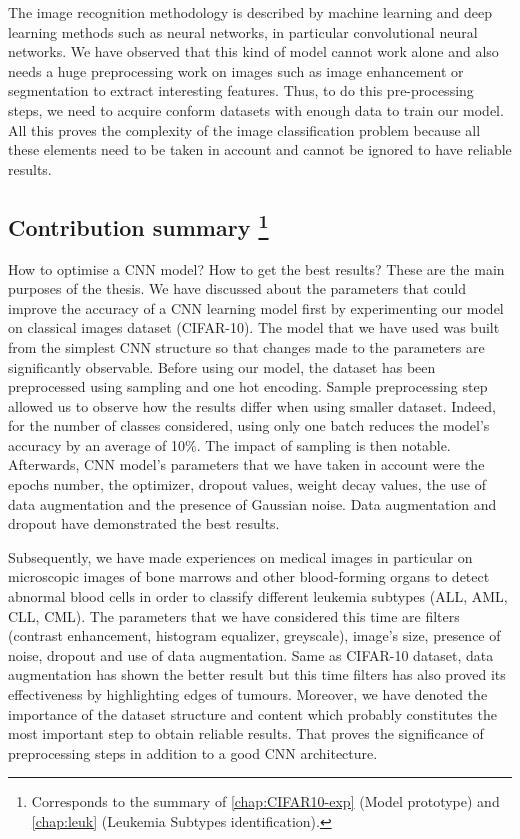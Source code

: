 \documentclass[11pt, openany]{report}
\theoremstyle{plain}
\theoremstyle{definition}
\theoremstyle{remark}
\begin{document}
The image recognition methodology is described by machine learning and deep learning methods such as neural networks, in particular convolutional neural networks. We have observed that this kind of model cannot work alone and also needs a huge preprocessing work on images such as image enhancement or segmentation to extract interesting features. Thus, to do this pre-processing steps, we need to acquire conform datasets with enough data to train our model. All this proves the complexity of the image classification problem because all these elements need to be taken in account and cannot be ignored to have reliable results.    

\subsection{Contribution summary \protect\footnote{Corresponds to the summary of \autoref{chap:CIFAR10-exp} (Model prototype) and \autoref{chap:leuk} (Leukemia Subtypes identification).}}
How to optimise a CNN model? How to get the best results? These are the main purposes of the thesis. We have discussed about the parameters that could improve the accuracy of a CNN learning model first by experimenting our model on classical images dataset (CIFAR-10). The model that we have used was built from the simplest CNN structure so that changes made to the parameters are significantly observable. Before using our model, the dataset has been preprocessed using sampling and one hot encoding. Sample preprocessing step allowed us to observe how the results differ when using smaller dataset. Indeed, for the number of classes considered, using only one batch reduces the model's accuracy by an average of 10\%. The impact of sampling is then notable. Afterwards, CNN model's parameters that we have taken in account were the epochs number, the optimizer, dropout values, weight decay values, the use of data augmentation and the presence of Gaussian noise. Data augmentation and dropout have demonstrated the best results. 

Subsequently, we have made experiences on medical images in particular on microscopic images of bone marrows and other blood-forming organs to detect abnormal blood cells in order to classify different leukemia subtypes (ALL, AML, CLL, CML). The parameters that we have considered this time are filters (contrast enhancement, histogram equalizer, greyscale), image's size, presence of noise, dropout and use of data augmentation. Same as CIFAR-10 dataset, data augmentation has shown the better result but this time filters has also proved its effectiveness by highlighting edges of tumours. Moreover, we have denoted the importance of the dataset structure and content which probably constitutes the most important step to obtain reliable results. That proves the significance of preprocessing steps in addition to a good CNN architecture.     
\end{document}
